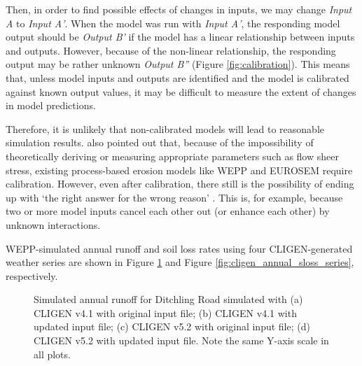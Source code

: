 Then, in order to find possible effects of changes in inputs, we may change
\emph{Input A} to \emph{Input A'}. When the model was run with \emph{Input A'},
the responding model output should be \emph{Output B'} if the model has a linear
relationship between inputs and outputs. However, because of the non-linear
relationship, the responding output may be rather unknown \emph{Output B''}
(Figure \ref{fig:calibration}). This means that, unless model inputs and outputs
are identified and the model is calibrated against known output values, it may
be difficult to measure the extent of changes in model predictions.

Therefore, it is unlikely that non-calibrated models will lead to reasonable
simulation results. \citet{wainwright2008-813} also pointed out that, because
of the impossibility of theoretically deriving or measuring appropriate
parameters such as flow sheer stress, existing process-based erosion models
like WEPP and EUROSEM require calibration. However, even after calibration,
there still is the possibility of ending up with `the right answer for the wrong
reason' \citep{favis-mortlock1994-use}. This is, for example, because two or
more model inputs cancel each other out (or enhance each other) by unknown
interactions.

WEPP-simulated annual runoff and soil loss rates using four CLIGEN-generated
weather series are shown in Figure \ref{fig:cligen_annual_runoff_serise} and
Figure \ref{fig:cligen_annual_sloss_series}, respectively.

\begin{figure}[htbp]
  \centering
  \qquad
  \caption[Simulated annual runoff for Ditchling Road]{Simulated annual
runoff for Ditchling Road simulated with (a) CLIGEN v4.1 with original input
file; (b) CLIGEN v4.1 with updated input file; (c) CLIGEN v5.2 with original
input file; (d) CLIGEN v5.2 with updated input file. Note the same Y-axis scale
in all plots.}
  \label{fig:cligen_annual_runoff_serise}
\end{figure}

